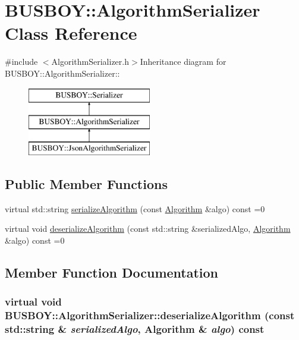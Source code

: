 \hypertarget{classBUSBOY_1_1AlgorithmSerializer}{
\section{BUSBOY::AlgorithmSerializer Class Reference}
\label{classBUSBOY_1_1AlgorithmSerializer}
}


{\ttfamily \#include $<$AlgorithmSerializer.h$>$}Inheritance diagram for BUSBOY::AlgorithmSerializer::\begin{figure}[H]
\begin{center}
\leavevmode
\includegraphics[height=3cm]{classBUSBOY_1_1AlgorithmSerializer}
\end{center}
\end{figure}
\subsection*{Public Member Functions}
\begin{DoxyCompactItemize}
\item 
virtual std::string \hyperlink{classBUSBOY_1_1AlgorithmSerializer_a70b04ce235dc839571885a368bdb2192}{serializeAlgorithm} (const \hyperlink{classBUSBOY_1_1Algorithm}{Algorithm} \&algo) const =0
\item 
virtual void \hyperlink{classBUSBOY_1_1AlgorithmSerializer_aa55f37cca334564784fa624d4dbacc46}{deserializeAlgorithm} (const std::string \&serializedAlgo, \hyperlink{classBUSBOY_1_1Algorithm}{Algorithm} \&algo) const =0
\end{DoxyCompactItemize}


\subsection{Member Function Documentation}
\hypertarget{classBUSBOY_1_1AlgorithmSerializer_aa55f37cca334564784fa624d4dbacc46}{
\subsubsection[{deserializeAlgorithm}]{\setlength{\rightskip}{0pt plus 5cm}virtual void BUSBOY::AlgorithmSerializer::deserializeAlgorithm (const std::string \& {\em serializedAlgo}, \/  {\bf Algorithm} \& {\em algo}) const}}
\label{classBUSBOY_1_1AlgorithmSerializer_aa55f37cca334564784fa624d4dbacc46}


